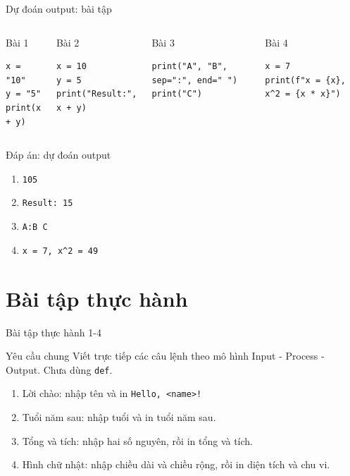 \documentclass[aspectratio=169,10pt]{beamer}
\begin{document}
\begin{frame}[fragile]{Dự đoán output: bài tập}
\begin{columns}[T,onlytextwidth]
\begin{block}{Bài 1}
\begin{lstlisting}
x = "10"
y = "5"
print(x + y)
\end{lstlisting}
\end{block}
\begin{block}{Bài 2}
\begin{lstlisting}
x = 10
y = 5
print("Result:", x + y)
\end{lstlisting}
\end{block}
\begin{block}{Bài 3}
\begin{lstlisting}
print("A", "B", sep=":", end=" ")
print("C")
\end{lstlisting}
\end{block}
\begin{block}{Bài 4}
\begin{lstlisting}
x = 7
print(f"x = {x}, x^2 = {x * x}")
\end{lstlisting}
\end{block}
\end{columns}
\end{frame}

\begin{frame}{Đáp án: dự đoán output}
\begin{enumerate}
  \item \texttt{105}
  \item \texttt{Result: 15}
  \item \texttt{A:B C}
  \item \texttt{x = 7, x\string^2 = 49}
\end{enumerate}
\end{frame}

\section{Bài tập thực hành}

\begin{frame}{Bài tập thực hành 1-4}
\begin{block}{Yêu cầu chung}
Viết trực tiếp các câu lệnh theo mô hình Input - Process - Output. Chưa dùng \texttt{def}.
\end{block}
\begin{enumerate}
  \item Lời chào: nhập tên và in \texttt{Hello, <name>!}
  \item Tuổi năm sau: nhập tuổi và in tuổi năm sau.
  \item Tổng và tích: nhập hai số nguyên, rồi in tổng và tích.
  \item Hình chữ nhật: nhập chiều dài và chiều rộng, rồi in diện tích và chu vi.
\end{enumerate}
\end{frame}
\end{document}
